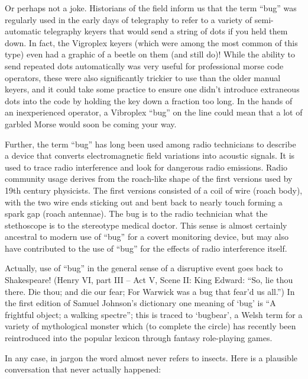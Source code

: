Or perhaps not a joke. Historians of the field inform us that the term ``bug''
was regularly used in the early days of telegraphy to refer to a variety of
semi-automatic telegraphy keyers that would send a string of dots if you held
them down. In fact, the Vigroplex keyers (which were among the most common of
this type) even had a graphic of a beetle on them (and still do)! While the
ability to send repeated dots automatically was very useful for professional
morse code operators, these were also significantly trickier to use than the
older manual keyers, and it could take some practice to ensure one didn't
introduce extraneous dots into the code by holding the key down a fraction too
long. In the hands of an inexperienced operator, a Vibroplex ``bug'' on the line
could mean that a lot of garbled Morse would soon be coming your way.

Further, the term ``bug'' has long been used among radio technicians to describe
a device that converts electromagnetic field variations into acoustic signals.
It is used to trace radio interference and look for dangerous radio emissions.
Radio community usage derives from the roach-like shape of the first versions
used by 19th century physicists. The first versions consisted of a coil of wire
(roach body), with the two wire ends sticking out and bent back to nearly touch
forming a spark gap (roach antennae). The bug is to the radio technician what
the stethoscope is to the stereotype medical doctor. This sense is almost
certainly ancestral to modern use of ``bug'' for a covert monitoring device, but
may also have contributed to the use of ``bug'' for the effects of radio
interference itself.

Actually, use of ``bug'' in the general sense of a disruptive event goes back to
Shakespeare! (Henry VI, part III -- Act V, Scene II: King Edward: ``So, lie thou there. Die thou; and
die our fear; For Warwick was a bug that fear'd us all.'') In the first edition
of Samuel Johnson's dictionary one meaning of `bug' is ``A frightful object; a
walking spectre''; this is traced to `bugbear', a Welsh term for a variety of
mythological monster which (to complete the circle) has recently been
reintroduced into the popular lexicon through fantasy role-playing games.

In any case, in jargon the word almost never refers to insects. Here is a
plausible conversation that never actually happened:

